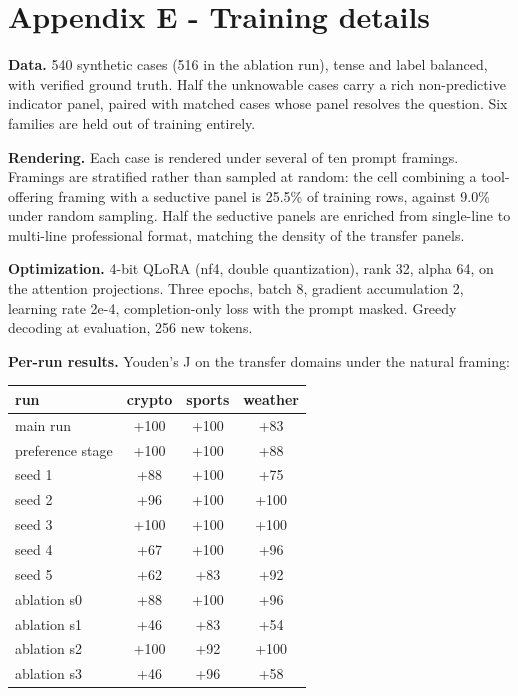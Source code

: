 \documentclass[10pt]{article}
\newcommand{\tablefont}{\fontsize{8.7pt}{11.5pt}\selectfont}
\begin{document}
\FloatBarrier
\section*{Appendix E - Training details}

\textbf{Data.} 540 synthetic cases (516 in the ablation run), tense and label balanced, with verified ground truth. Half the unknowable cases carry a rich non-predictive indicator panel, paired with matched cases whose panel resolves the question. Six families are held out of training entirely.

\textbf{Rendering.} Each case is rendered under several of ten prompt framings. Framings are stratified rather than sampled at random: the cell combining a tool-offering framing with a seductive panel is 25.5\% of training rows, against 9.0\% under random sampling. Half the seductive panels are enriched from single-line to multi-line professional format, matching the density of the transfer panels.

\textbf{Optimization.} 4-bit QLoRA (nf4, double quantization), rank 32, alpha 64, on the attention projections. Three epochs, batch 8, gradient accumulation 2, learning rate 2e-4, completion-only loss with the prompt masked. Greedy decoding at evaluation, 256 new tokens.

\textbf{Per-run results.} Youden's J on the transfer domains under the natural framing:

\begin{table}[!htbp]
\centering
\tablefont
\begin{tabular}{|l|c|c|c|}
\hline
\rowcolor{tblhead}\textbf{run} & \textbf{crypto} & \textbf{sports} & \textbf{weather} \\
\hline
main run & +100 & +100 & +83 \\
\hline
preference stage & +100 & +100 & +88 \\
\hline
seed 1 & +88 & +100 & +75 \\
\hline
seed 2 & +96 & +100 & +100 \\
\hline
seed 3 & +100 & +100 & +100 \\
\hline
seed 4 & +67 & +100 & +96 \\
\hline
seed 5 & +62 & +83 & +92 \\
\hline
ablation s0 & +88 & +100 & +96 \\
\hline
ablation s1 & +46 & +83 & +54 \\
\hline
ablation s2 & +100 & +92 & +100 \\
\hline
ablation s3 & +46 & +96 & +58 \\
\hline
\end{tabular}
\end{table}
\end{document}
